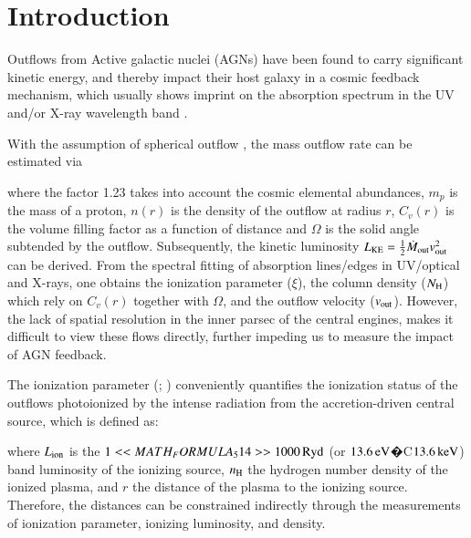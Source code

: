\documentclass{aa}
\begin{document}
  
  \maketitle  
%





\section{Introduction}\label{introduction}

Outflows from Active galactic nuclei (AGNs) have been found to carry significant kinetic energy, and thereby impact their host galaxy in a cosmic feedback mechanism, which usually shows imprint on the absorption spectrum in the UV and/or X-ray wavelength band \citep{Laha2021NatAs}.

With the assumption of spherical outflow \citep{Blustin2005A&A}, the mass outflow rate can be estimated via

where the factor 1.23 takes into account the cosmic elemental abundances, $m_{p}$ is the mass of a proton, $n(r)$ is the density of the outflow at radius $r$, $C_{v}(r)$ is the volume filling factor as a function of distance and $\Omega$ is the solid angle subtended by the outflow.
Subsequently, the kinetic luminosity \( L_{\rm KE} = \frac{1}{2} \dot{M}_{\rm out} v_{\rm out}^{2} \) can be derived.
From the spectral fitting of absorption lines/edges in UV/optical and X-rays, one obtains the ionization parameter ($\xi$), the column density ($N_{\rm H}$) which rely on $C_{v}(r)$ together with $\Omega$, and the outflow velocity ($v_{\rm out}$).
However, the lack of spatial resolution in the inner parsec of the central engines, makes it difficult to view these flows directly, further impeding us to measure the impact of AGN feedback.


The ionization parameter (\citealp{Tarter1969ApJ}; \citealp{Krolik1981ApJ}) conveniently quantifies the ionization status of the outflows photoionized by the intense radiation from the accretion-driven central source, which is defined as:

where $L_{\rm ion}$ is the $1<<MATH_FORMULA_514>>1000 \rm \, Ryd$ (or $\rm 13.6 \, eV$�C$\rm 13.6 \, keV$) band luminosity of the ionizing source, $n_{\rm H}$ the hydrogen number density of the ionized plasma, and $r$ the distance of the plasma to the ionizing source.
Therefore, the distances can be constrained indirectly through the measurements of ionization parameter, ionizing luminosity, and density.
\end{document}
